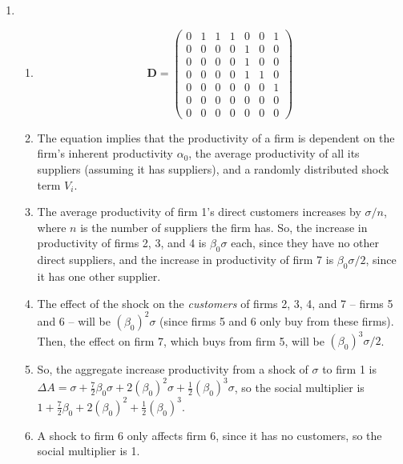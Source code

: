 \documentclass{article}
\begin{document}
\begin{enumerate}

	\item

	\begin{enumerate}

		\item

		\begin{equation*}
		\mathbf{D} = \begin{pmatrix}
		 0 & 1 & 1 & 1 & 0 & 0 & 1 \\ 
		 0 & 0 & 0 & 0 & 1 & 0 & 0 \\ 
		 0 & 0 & 0 & 0 & 1 & 0 & 0 \\ 
		 0 & 0 & 0 & 0 & 1 & 1 & 0 \\ 
		 0 & 0 & 0 & 0 & 0 & 0 & 1 \\ 
		 0 & 0 & 0 & 0 & 0 & 0 & 0 \\ 
		 0 & 0 & 0 & 0 & 0 & 0 & 0 
		\end{pmatrix}
		\end{equation*}

		\item The equation implies that the productivity of a firm is dependent on the firm's inherent productivity $\alpha_0$, the average productivity of all its suppliers (assuming it has suppliers), and a randomly distributed shock term $V_i$. 

		\item The average productivity of firm 1's direct customers increases by $\sigma/n$, where $n$ is the number of suppliers the firm has. So, the increase in productivity of firms 2, 3, and 4 is $\beta_0 \sigma$ each, since they have no other direct suppliers, and the increase in productivity of firm 7 is $\beta_0 \sigma/2$, since it has one other supplier.

		\item The effect of the shock on the \textit{customers} of firms 2, 3, 4, and 7 -- firms 5 and 6 -- will be $(\beta_0)^2 \sigma$ (since firms 5 and 6 only buy from these firms). Then, the effect on firm 7, which buys from firm 5, will be $(\beta_0)^3 \sigma/2$.

		\item So, the aggregate increase productivity from a shock of $\sigma$ to firm 1 is $\Delta A = \sigma + \frac{7}{2} \beta_0 \sigma + 2 (\beta_0)^2 \sigma + \frac{1}{2}(\beta_0)^3 \sigma$, so the social multiplier is $1 + \frac{7}{2} \beta_0 + 2 (\beta_0)^2 + \frac{1}{2}(\beta_0)^3$.

		\item A shock to firm 6 only affects firm 6, since it has no customers, so the social multiplier is 1. 

	\end{enumerate}

\end{enumerate}
\end{document}
